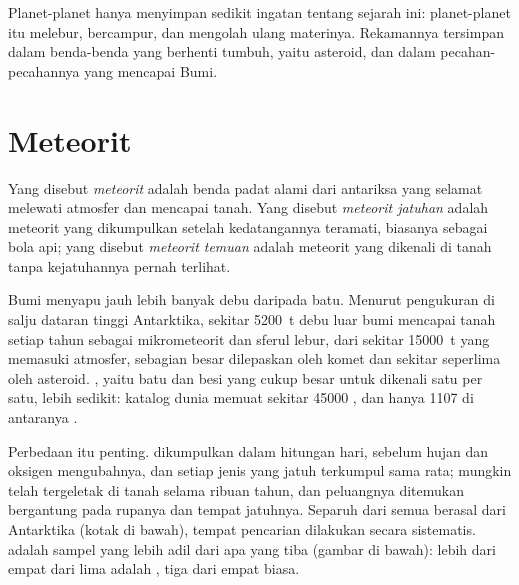 Planet-planet hanya menyimpan sedikit ingatan tentang sejarah ini: planet-planet itu melebur,
bercampur, dan mengolah ulang materinya. Rekamannya tersimpan dalam benda-benda yang berhenti
tumbuh, yaitu asteroid, dan dalam pecahan-pecahannya yang mencapai Bumi.

\section{Meteorit}

\begin{definition}
\label{def:b2:planet-formation-meteorites:fall-find}
Yang disebut \emph{meteorit} adalah benda padat alami dari antariksa yang
selamat melewati atmosfer dan mencapai tanah. Yang disebut
\emph{meteorit jatuhan} adalah meteorit yang dikumpulkan setelah
kedatangannya teramati, biasanya sebagai bola api; yang disebut \emph{meteorit
temuan} adalah meteorit yang dikenali di tanah tanpa kejatuhannya
pernah terlihat.
\end{definition}

Bumi menyapu jauh lebih banyak debu daripada batu. Menurut pengukuran di salju
dataran tinggi Antarktika, sekitar \qty{5200}{t} debu luar bumi mencapai
tanah setiap tahun sebagai mikrometeorit dan sferul lebur, dari sekitar
\qty{15000}{t} yang memasuki atmosfer, sebagian besar dilepaskan oleh komet dan sekitar
seperlima oleh asteroid. , yaitu batu dan besi yang cukup besar untuk
dikenali satu per satu, lebih sedikit: katalog dunia memuat sekitar
\num{45000} , dan hanya \num{1107} di antaranya .

Perbedaan itu penting.  dikumpulkan dalam hitungan hari, sebelum hujan dan
oksigen mengubahnya, dan setiap jenis  yang jatuh terkumpul
sama rata;  mungkin telah tergeletak di tanah selama ribuan tahun, dan
peluangnya ditemukan bergantung pada rupanya dan tempat jatuhnya. Separuh dari semua
 berasal dari Antarktika (kotak di bawah), tempat pencarian dilakukan secara
sistematis.  adalah sampel yang lebih adil dari apa yang tiba (gambar di bawah):
lebih dari empat dari lima adalah , tiga dari empat  biasa.

